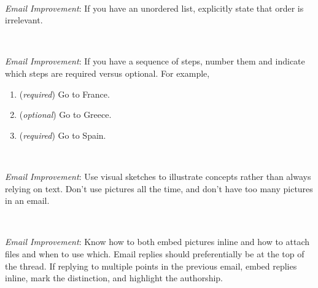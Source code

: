 \ \\
\begin{samepage}
\textit{Email Improvement}: If you have an unordered list, explicitly state that order is irrelevant.
\end{samepage}

\ \\
\begin{samepage}
\textit{Email Improvement}: If you have a sequence of steps, number them and indicate which steps are required versus optional. For example,
\begin{enumerate}
    \item (\textit{required}) Go to France.
    \item (\textit{optional}) Go to Greece.
    \item (\textit{required}) Go to Spain.
\end{enumerate}
\end{samepage}

\ \\
\begin{samepage}
\textit{Email Improvement}: Use visual sketches to illustrate concepts rather than always relying on text. Don't use pictures all the time, and don't have too many pictures in an email. 
\end{samepage}

\ \\
\begin{samepage}
\textit{Email Improvement}: Know how to both embed pictures inline and how to attach files and when to use which. 
Email replies should preferentially be at the top of the thread. 
If replying to multiple points in the previous email, embed replies inline, mark the distinction, and highlight the authorship. 
\end{samepage}

